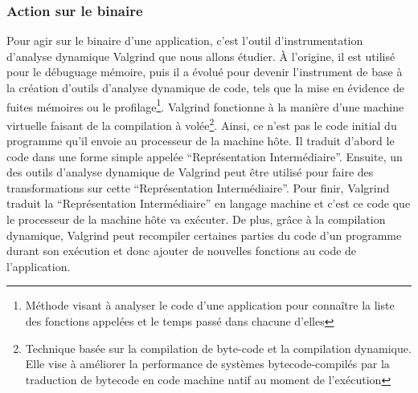 \subsubsection{Action sur le binaire}
Pour agir sur le binaire d'une application, c'est l'outil d'instrumentation
d'analyse dynamique Valgrind \citep{Valgrind, Valgrindweb} que nous allons étudier. À l'origine, il est utilisé
pour le débuguage mémoire, puis il a évolué pour devenir l'instrument de base à
la création d'outils d'analyse dynamique de code, tels que la mise en évidence
de fuites mémoires ou le profilage\footnote{Méthode visant à analyser le code
  d'une application pour connaître la liste des fonctions appelées et le temps
  passé dans chacune d'elles}. Valgrind fonctionne à la manière d'une machine
virtuelle faisant de la compilation à volée\footnote{Technique basée sur la
  compilation de byte-code et la compilation dynamique. Elle vise à améliorer la
  performance de systèmes bytecode-compilés par la traduction de bytecode en
  code machine natif au moment de l'exécution}. Ainsi, ce n'est pas le code
initial du programme qu'il envoie au processeur de la machine hôte. Il traduit
d'abord le code dans une forme simple appelée ``Représentation Intermédiaire''. Ensuite, un des outils d'analyse dynamique de Valgrind peut être
utilisé pour faire des transformations sur cette ``Représentation
Intermédiaire''. Pour finir, Valgrind traduit la ``Représentation
Intermédiaire'' en langage machine et c'est ce code que le processeur de la
machine hôte va exécuter. De plus, grâce à la compilation dynamique, Valgrind
peut recompiler certaines parties du code d'un programme durant son exécution et
donc ajouter de nouvelles fonctions au code de l'application.


